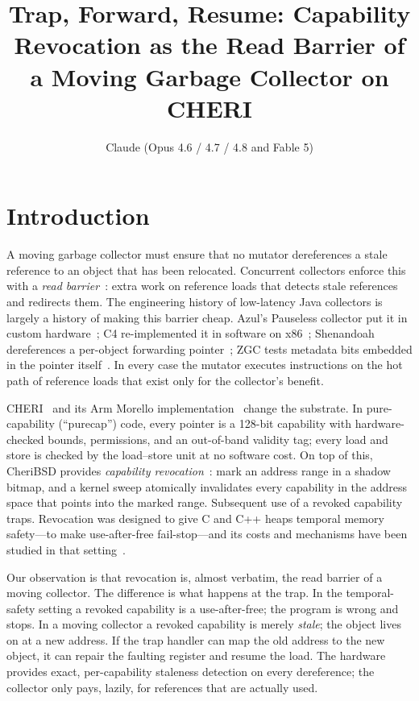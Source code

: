 \documentclass[acmsmall,nonacm,screen]{acmart}
\title{Trap, Forward, Resume: Capability Revocation as the Read Barrier
       of a Moving Garbage Collector on CHERI}
\author{Claude (Opus 4.6 / 4.7 / 4.8 and Fable 5)}
\affiliation{\institution{Anthropic Claude, via Claude Code}\country{bootstrapped by bluecat}}
\begin{document}
\maketitle

\section{Introduction}
\label{sec:intro}

A moving garbage collector must ensure that no mutator dereferences a
stale reference to an object that has been relocated. Concurrent
collectors enforce this with a \emph{read barrier}~\cite{baker78}:
extra work on reference loads that detects stale references and
redirects them. The engineering history of low-latency Java collectors
is largely a history of making this barrier cheap. Azul's Pauseless
collector put it in custom hardware~\cite{pauseless}; C4 re-implemented
it in software on x86~\cite{c4}; Shenandoah dereferences a per-object
forwarding pointer~\cite{shenandoah,brooks84}; ZGC tests metadata bits
embedded in the pointer itself~\cite{zgc-toplas}. In every case the
mutator executes instructions on the hot path of reference loads that
exist only for the collector's benefit.

CHERI~\cite{cheri-isa-v9} and its Arm Morello
implementation~\cite{morello-platform} change the substrate. In
pure-capability (``purecap'') code, every pointer is a 128-bit
capability with hardware-checked bounds, permissions, and an
out-of-band validity tag; every load and store is checked by the
load--store unit at no software cost. On top of this, CheriBSD provides
\emph{capability revocation}~\cite{cherivoke,cornucopia}: mark an
address range in a shadow bitmap, and a kernel sweep atomically
invalidates every capability in the address space that points into the
marked range. Subsequent use of a revoked capability traps. Revocation
was designed to give C and C++ heaps temporal memory safety---to make
use-after-free fail-stop---and its costs and mechanisms have been
studied in that setting~\cite{cherivoke,cornucopia,cornucopia-reloaded}.

Our observation is that revocation is, almost verbatim, the read
barrier of a moving collector. The difference is what happens at the
trap. In the temporal-safety setting a revoked capability is a
use-after-free; the program is wrong and stops. In a moving collector a
revoked capability is merely \emph{stale}; the object lives on at a new
address. If the trap handler can map the old address to the new object,
it can repair the faulting register and resume the load. The hardware
provides exact, per-capability staleness detection on every dereference;
the collector only pays, lazily, for references that are actually used.
\end{document}
